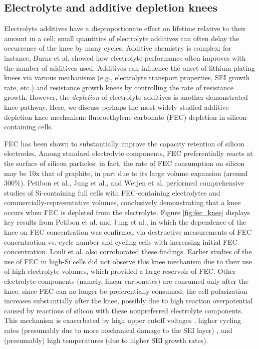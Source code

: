 \documentclass[journal=jpclcd,manuscript=article]{achemso}
\begin{document}
\subsection{Electrolyte and additive depletion knees}

Electrolyte additives have a disproportionate effect on lifetime relative to their amount in a cell; small quantities of electrolyte additives can often delay the occurrence of the knee by many cycles.\cite{ma_editors_2019, li_comparison_2017} Additive chemistry is complex; for instance, Burns et al.\cite{burns_predicting_2013} showed how electrolyte performance often improves with the number of additives used. Additives can influence the onset of lithium plating knees via various mechanisms (e.g., electrolyte transport properties, SEI growth rate, etc.) and resistance growth knees by controlling the rate of resistance growth\cite{ma_editors_2019}. However, the \textit{depletion} of electrolyte additives is another demonstrated knee pathway. Here, we discuss perhaps the most widely studied additive depletion knee mechanism: fluoroethylene carbonate (FEC) depletion in silicon-containing cells.

FEC has been shown to substantially improve the capacity retention of silicon electrodes.\cite{choi_effect_2006, etacheri_effect_2012}
Among standard electrolyte components, FEC preferentially reacts at the surface of silicon particles; in fact, the rate of FEC consumption on silicon may be 10x that of graphite, in part due to its large volume expansion (around 300\%).\cite{wetjen_differentiating_2017}
Petibon et al.\cite{petibon_studies_2016},
Jung et al.\cite{jung_consumption_2016},
and Wetjen et al.\cite{wetjen_differentiating_2017}
performed comprehensive studies of Si-containing full cells with FEC-containing electrolytes and commercially-representative volumes,
conclusively demonstrating that a knee occurs when FEC is depleted from the electrolyte.
Figure \ref{fig:fec_knee} displays key results from Petibon et al.\cite{petibon_studies_2016} and
Jung et al.\cite{jung_consumption_2016}, in which the dependence of the knee on FEC concentration was confirmed via destructive measurements of FEC concentration vs. cycle number\cite{petibon_studies_2016} and cycling cells with increasing initial FEC concentration\cite{jung_consumption_2016}.
Louli et al.\cite{louli_operando_2019} also corroborated these findings.
Earlier studies of the use of FEC in high-Si cells\cite{choi_effect_2006, etacheri_effect_2012} did not observe this knee mechanism due to their use of high electrolyte volumes, which provided a large reservoir of FEC.
Other electrolyte components (namely, linear carbonates) are consumed only after the knee, since FEC can no longer be preferentially consumed\cite{petibon_studies_2016}; the cell polarization increases substantially after the knee\cite{petibon_studies_2016, jung_consumption_2016, wetjen_differentiating_2017}, possibly due to high reaction overpotential caused by reactions of silicon with these nonpreferred electrolyte components.
This mechanism is exacerbated by high upper cutoff voltages \cite{petibon_studies_2016}, higher cycling rates (presumably due to more mechanical damage to the SEI layer) \cite{petibon_studies_2016}, and (presumably) high temperatures (due to higher SEI growth rates).
\end{document}
